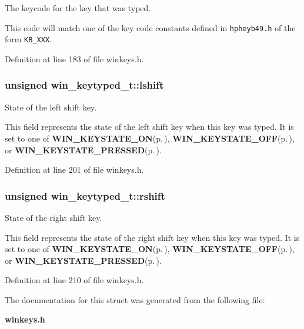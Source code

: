 The keycode for the key that was typed. 

This code will match one of the key code constants defined in {\tt hpheyb49.h} of the form {\tt KB\_\-XXX}. 

Definition at line 183 of file winkeys.h.
\subsubsection{\setlength{\rightskip}{0pt plus 5cm}unsigned {\bf win\_\-keytyped\_\-t::lshift}}\label{structwin__keytyped__t_o2}


State of the left shift key. 

This field represents the state of the left shift key when this key was typed. It is set to one of {\bf WIN\_\-KEYSTATE\_\-ON}{\rm (p.\,\pageref{winkeys_8h_a7})}, {\bf WIN\_\-KEYSTATE\_\-OFF}{\rm (p.\,\pageref{winkeys_8h_a6})}, or {\bf WIN\_\-KEYSTATE\_\-PRESSED}{\rm (p.\,\pageref{winkeys_8h_a9})}. 

Definition at line 201 of file winkeys.h.
\subsubsection{\setlength{\rightskip}{0pt plus 5cm}unsigned {\bf win\_\-keytyped\_\-t::rshift}}\label{structwin__keytyped__t_o3}


State of the right shift key. 

This field represents the state of the right shift key when this key was typed. It is set to one of {\bf WIN\_\-KEYSTATE\_\-ON}{\rm (p.\,\pageref{winkeys_8h_a7})}, {\bf WIN\_\-KEYSTATE\_\-OFF}{\rm (p.\,\pageref{winkeys_8h_a6})}, or {\bf WIN\_\-KEYSTATE\_\-PRESSED}{\rm (p.\,\pageref{winkeys_8h_a9})}. 

Definition at line 210 of file winkeys.h.

The documentation for this struct was generated from the following file:\begin{CompactItemize}
\item 
{\bf winkeys.h}\end{CompactItemize}
